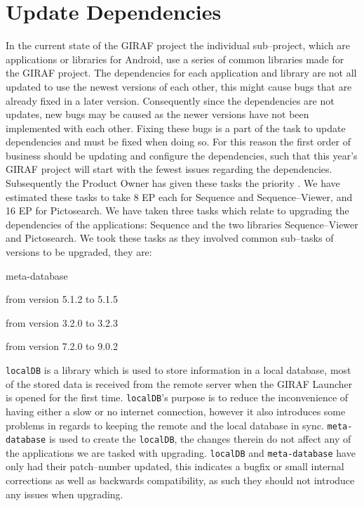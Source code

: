 \section{Update Dependencies}
In the current state of the GIRAF project the individual sub--project, which are applications or libraries for Android, use a series of common libraries made for the GIRAF project.
The dependencies for each application and library are not all updated to use the newest versions of each other, this might cause bugs that are already fixed in a later version.
Consequently since the dependencies are not updates, new bugs may be caused as the newer versions have not been implemented with each other.
Fixing these bugs is a part of the task to update dependencies and must be fixed when doing so.
For this reason the first order of business should be updating and configure the dependencies, such that this year's GIRAF project will start with the fewest issues regarding the dependencies.
Subsequently the Product Owner has given these tasks the priority \phigh.
We have estimated these tasks to take 8 EP each for Sequence and Sequence--Viewer, and 16 EP for Pictosearch.
We have taken three tasks which relate to upgrading the dependencies of the applications: Sequence and the two libraries Sequence--Viewer and Pictosearch.
We took these tasks as they involved common sub--tasks of versions to be upgraded, they are:
\begin{dankscription}{\ttfamily}{meta-database}
    \item[localDB] from version 5.1.2 to 5.1.5
    \item[meta-database] from version 3.2.0 to 3.2.3
    \item[oasisLib] from version 7.2.0 to 9.0.2
\end{dankscription}
\texttt{localDB} is a library which is used to store information in a local database, most of the stored data is received from the remote server when the GIRAF Launcher is opened for the first time.
\texttt{localDB}'s purpose is to reduce the inconvenience of having either a slow or no internet connection, however it also introduces some problems in regards to keeping the remote and the local database in sync.
\texttt{meta-database} is used to create the \texttt{localDB}, the changes therein do not affect any of the applications we are tasked with upgrading.
\texttt{localDB} and \texttt{meta-database} have only had their patch--number updated, this indicates a bugfix or small internal corrections as well as backwards compatibility, as such they should not introduce any issues when upgrading.

